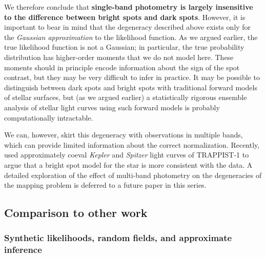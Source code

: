 \documentclass[modern,linenumbers]{aastex62}
\begin{document}
We therefore conclude that \textbf{single-band photometry is largely insensitive to
    the difference between bright spots and dark spots}. However, it is
important to bear in mind that the
degeneracy described above exists only for the \emph{Gaussian approximation}
to the likelihood function. As we argued earlier, the true likelihood function
is not a Gaussian; in particular, the true probability distribution
has higher-order moments that we do not model here. These moments should
in principle encode information about the sign of the spot contrast, but they
may be very difficult to infer in practice. It may be possible to distinguish
between dark spots and bright spots with traditional forward models of stellar
surfaces, but (as we argued earlier) a statistically rigorous ensemble analysis
of stellar light curves using such forward models is probably computationally
intractable.

We can, however, skirt this degeneracy with observations in multiple bands,
which can provide limited information about the correct normalization. Recently,
\citet{Morris2018} used approximately coeval \emph{Kepler} and \emph{Spitzer}
light curves of TRAPPIST-1 to argue that a bright spot model for the star
is more consistent with the data. A detailed exploration of the
effect of multi-band photometry on the degeneracies of the mapping problem
is deferred to a future paper in this series.


\subsection{Comparison to other work}
\label{sec:other-work}

\subsubsection{Synthetic likelihoods, random fields, and approximate inference}
\end{document}
